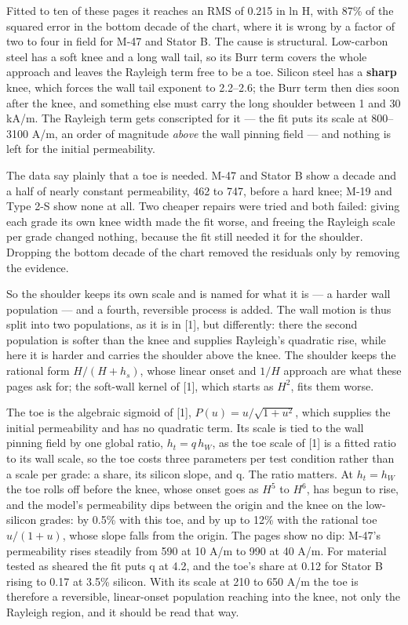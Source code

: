 \documentclass[
  11pt,
]{article}
\newcounter{none} %
\begin{document}
Fitted to ten of these pages it reaches an RMS of 0.215 in ln H, with 87\% of the squared error in the bottom decade of the chart, where it is wrong by a factor of two to four in field for M-47 and Stator B. The cause is structural. Low-carbon steel has a soft knee and a long wall tail, so its Burr term covers the whole approach and leaves the Rayleigh term free to be a toe. Silicon steel has a \textbf{sharp} knee, which forces the wall tail exponent to 2.2--2.6; the Burr term then dies soon after the knee, and something else must carry the long shoulder between 1 and 30 kA/m. The Rayleigh term gets conscripted for it --- the fit puts its scale at 800--3100 A/m, an order of magnitude \emph{above} the wall pinning field --- and nothing is left for the initial permeability.

The data say plainly that a toe is needed. M-47 and Stator B show a decade and a half of nearly constant permeability, 462 to 747, before a hard knee; M-19 and Type 2-S show none at all. Two cheaper repairs were tried and both failed: giving each grade its own knee width made the fit worse, and freeing the Rayleigh scale per grade changed nothing, because the fit still needed it for the shoulder. Dropping the bottom decade of the chart removed the residuals only by removing the evidence.

So the shoulder keeps its own scale and is named for what it is --- a harder wall population --- and a fourth, reversible process is added. The wall motion is thus split into two populations, as it is in {[}1{]}, but differently: there the second population is softer than the knee and supplies Rayleigh's quadratic rise, while here it is harder and carries the shoulder above the knee. The shoulder keeps the rational form \(H/(H+h_s)\), whose linear onset and \(1/H\) approach are what these pages ask for; the soft-wall kernel of {[}1{]}, which starts as \(H^{2}\), fits them worse.

The toe is the algebraic sigmoid of {[}1{]}, \(P(u) = u/\sqrt{1+u^{2}}\), which supplies the initial permeability and has no quadratic term. Its scale is tied to the wall pinning field by one global ratio, \(h_t = q\,h_W\), as the toe scale of {[}1{]} is a fitted ratio to its wall scale, so the toe costs three parameters per test condition rather than a scale per grade: a share, its silicon slope, and q. The ratio matters. At \(h_t = h_W\) the toe rolls off before the knee, whose onset goes as \(H^{5}\) to \(H^{6}\), has begun to rise, and the model's permeability dips between the origin and the knee on the low-silicon grades: by 0.5\% with this toe, and by up to 12\% with the rational toe \(u/(1+u)\), whose slope falls from the origin. The pages show no dip: M-47's permeability rises steadily from 590 at 10 A/m to 990 at 40 A/m. For material tested as sheared the fit puts q at 4.2, and the toe's share at 0.12 for Stator B rising to 0.17 at 3.5\% silicon. With its scale at 210 to 650 A/m the toe is therefore a reversible, linear-onset population reaching into the knee, not only the Rayleigh region, and it should be read that way.
\end{document}
